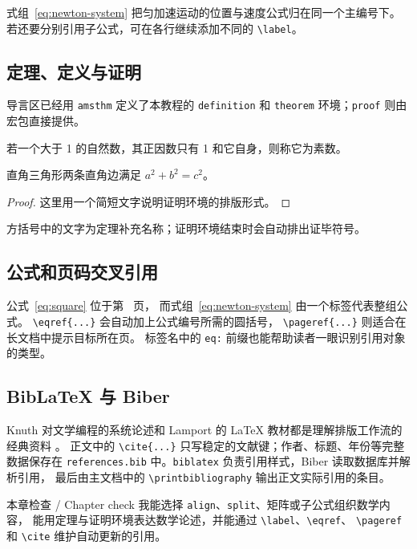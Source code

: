 式组~\eqref{eq:newton-system} 把匀加速运动的位置与速度公式归在同一个主编号下。
若还要分别引用子公式，可在各行继续添加不同的 \verb|\label|。

\subsection{定理、定义与证明}

导言区已经用 \texttt{amsthm} 定义了本教程的 \texttt{definition} 和
\texttt{theorem} 环境；\texttt{proof} 则由宏包直接提供。

\begin{definition}
若一个大于 1 的自然数，其正因数只有 1 和它自身，则称它为素数。
\end{definition}

\begin{theorem}[勾股定理]
直角三角形两条直角边满足 $a^2+b^2=c^2$。
\end{theorem}

\begin{proof}
这里用一个简短文字说明证明环境的排版形式。
\end{proof}

方括号中的文字为定理补充名称；证明环境结束时会自动排出证毕符号。

\subsection{公式和页码交叉引用}

公式~\eqref{eq:square} 位于第~\pageref{eq:square} 页，
而式组~\eqref{eq:newton-system} 由一个标签代表整组公式。
\verb|\eqref{...}| 会自动加上公式编号所需的圆括号，
\verb|\pageref{...}| 则适合在长文档中提示目标所在页。
标签名中的 \texttt{eq:} 前缀也能帮助读者一眼识别引用对象的类型。

\subsection{BibLaTeX 与 Biber}

Knuth 对文学编程的系统论述和 Lamport 的 LaTeX 教材都是理解排版工作流的经典资料
\cite{knuth1984literate,lamport1994latex}。
正文中的 \verb|\cite{...}| 只写稳定的文献键；作者、标题、年份等完整数据保存在
\texttt{references.bib} 中。\texttt{biblatex} 负责引用样式，Biber 读取数据库并解析引用，
最后由主文档中的 \verb|\printbibliography| 输出正文实际引用的条目。

\begin{learningbox}{本章检查 / Chapter check}
我能选择 \texttt{align}、\texttt{split}、矩阵或子公式组织数学内容，
能用定理与证明环境表达数学论述，并能通过 \verb|\label|、\verb|\eqref|、
\verb|\pageref| 和 \verb|\cite| 维护自动更新的引用。
\end{learningbox}
